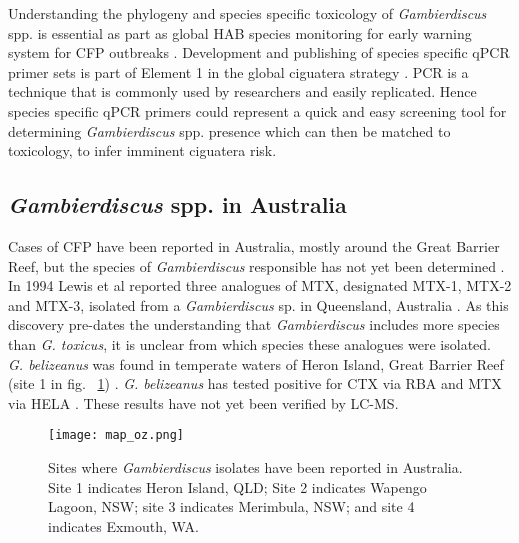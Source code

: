 \documentclass[12pt]{article}
\begin{document}
Understanding the phylogeny and species specific toxicology of \emph{Gambierdiscus} spp. is essential as part as global HAB species monitoring for early warning system for CFP outbreaks \cite{berdalet2012global}. Development and publishing of species specific qPCR primer sets is part of Element 1 in the global ciguatera strategy \cite{globalcig}. PCR is a technique that is commonly used by researchers and easily replicated. Hence species specific qPCR primers could represent a quick and easy screening tool for determining \emph{Gambierdiscus} spp. presence which can then be matched to toxicology, to infer imminent ciguatera risk.


\subsection{\emph{Gambierdiscus} spp. in Australia}
Cases of CFP have been reported in Australia, mostly around the Great Barrier Reef, but the species of \emph{Gambierdiscus} responsible has not yet been determined \cite{lewis2006ciguatera}.\\

In 1994 Lewis et al reported three analogues of MTX, designated MTX-1, MTX-2 and MTX-3, isolated from a \emph{Gambierdiscus} sp. in Queensland, Australia \cite{holmes1994purification}. As this discovery pre-dates the understanding that \emph{Gambierdiscus} includes more species than \emph{G. toxicus}, it is unclear from which species these analogues were isolated.  \\


\emph{G. belizeanus} was found in temperate waters of Heron Island, Great Barrier Reef (site 1 in fig. ~\ref{fig:OzSites}) \cite{murray2014molecular}. \emph{G. belizeanus} has tested positive for CTX via RBA \cite{chinain2010growth} and MTX via HELA \cite{holland2013differences}. These results have not yet been verified by LC-MS.\\

\begin{figure} 
\texttt{[image: map\_oz.png]}
\caption{Sites where \emph{Gambierdiscus} isolates have been reported in Australia. Site 1 indicates Heron Island, QLD; Site 2 indicates Wapengo Lagoon, NSW; site 3 indicates Merimbula, NSW; and site 4 indicates Exmouth, WA.} 
\label{fig:OzSites}
\end{figure} 
\FloatBarrier
\end{document}
